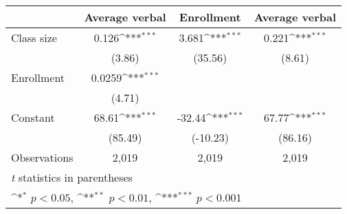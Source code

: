 {
\def\sym#1{\ifmmode^{#1}\else\(^{#1}\)\fi}
\begin{tabular}{l*{3}{c}}
\hline\hline
          &\multicolumn{1}{c}{Average verbal}&\multicolumn{1}{c}{Enrollment}&\multicolumn{1}{c}{Average verbal}\\
\hline
Class size&    0.126\sym{***}&    3.681\sym{***}&    0.221\sym{***}\\
          &   (3.86)         &  (35.56)         &   (8.61)         \\
Enrollment&   0.0259\sym{***}&                  &                  \\
          &   (4.71)         &                  &                  \\
Constant  &    68.61\sym{***}&   -32.44\sym{***}&    67.77\sym{***}\\
          &  (85.49)         & (-10.23)         &  (86.16)         \\
\hline
Observations&    2,019         &    2,019         &    2,019         \\
\hline\hline
\multicolumn{4}{l}{\footnotesize \textit{t} statistics in parentheses}\\
\multicolumn{4}{l}{\footnotesize \sym{*} \(p<0.05\), \sym{**} \(p<0.01\), \sym{***} \(p<0.001\)}\\
\end{tabular}
}
